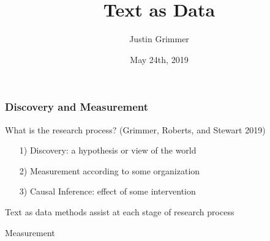 \documentclass{beamer}
\title[Text as Data] %
{Text as Data}
\author{Justin Grimmer}
\institute[Stanford University]{Professor\\Department of Political Science \\  Stanford University}
\date{May 24th, 2019}%
\numberwithin{equation}{section}
\begin{document}
\begin{frame}
\titlepage
\end{frame}



\begin{frame}
\frametitle{Discovery and Measurement}

What is the research process? (Grimmer, Roberts, and Stewart 2019)

\begin{itemize}
  \item[1)] \alert{Discovery}: a hypothesis or view of the world
  \item[2)] \alert{Measurement} according to some organization
  \item[3)] \alert{Causal Inference}: effect of some intervention
\end{itemize}

Text as data methods assist at each stage of research process

\end{frame}



\begin{frame}

\huge

Measurement


\end{frame}













\end{document}

